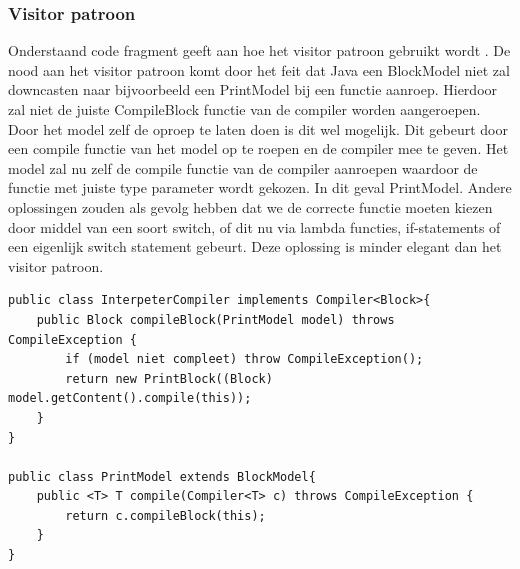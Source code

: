 \documentclass[]{article}
\begin{document}
\subsubsection{Visitor patroon}
\label{visitorpatroon}
Onderstaand code fragment geeft aan hoe het visitor patroon gebruikt wordt \cite{Visitor}. De nood aan het visitor patroon komt door het feit dat Java een BlockModel niet zal downcasten naar bijvoorbeeld een PrintModel bij een functie aanroep. Hierdoor zal niet de juiste CompileBlock functie van de compiler worden aangeroepen. Door het model zelf de oproep te laten doen is dit wel mogelijk. Dit gebeurt door een compile functie van het model op te roepen en de compiler mee te geven. Het model zal nu zelf de compile functie van de compiler aanroepen waardoor de functie met juiste type parameter wordt gekozen. In dit geval PrintModel. Andere oplossingen zouden als gevolg hebben dat we de correcte functie moeten kiezen door middel van een soort switch, of dit nu via lambda functies, if-statements of een eigenlijk switch statement gebeurt. Deze oplossing is minder elegant dan het visitor patroon.

\lstset{language=Java}
\begin{lstlisting}
public class InterpeterCompiler implements Compiler<Block>{
	public Block compileBlock(PrintModel model) throws CompileException {
		if (model niet compleet) throw CompileException();
		return new PrintBlock((Block) model.getContent().compile(this));
	}
}

public class PrintModel extends BlockModel{
	public <T> T compile(Compiler<T> c) throws CompileException {
		return c.compileBlock(this);
	}
}
\end{lstlisting}
\end{document}
